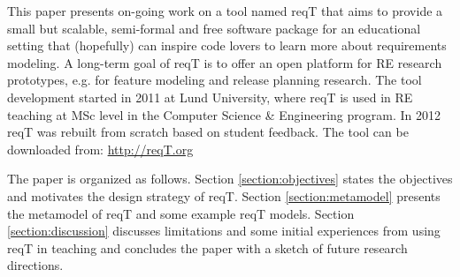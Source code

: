 \documentclass[a4paper]{llncs}
\begin{document}
This paper presents on-going work on a tool named reqT that aims to provide a small but scalable, semi-formal and free software package for an educational setting that (hopefully) can inspire code lovers to learn more about requirements modeling. A long-term goal of reqT is to offer an open platform for RE research prototypes, e.g. for feature modeling and release planning research. The tool development started in 2011 at Lund University, where reqT is used in RE teaching at MSc level in the Computer Science \& Engineering program. In 2012 reqT was rebuilt from scratch based on student feedback. The tool can be downloaded from: \url{http://reqT.org} 

The paper is organized as follows. Section \ref{section:objectives} states the objectives and motivates the design strategy of reqT. Section \ref{section:metamodel} presents the metamodel of reqT and some example reqT models. Section \ref{section:discussion} discusses limitations and some initial experiences from using reqT in teaching and concludes the paper with a sketch of future research directions.
\end{document}
